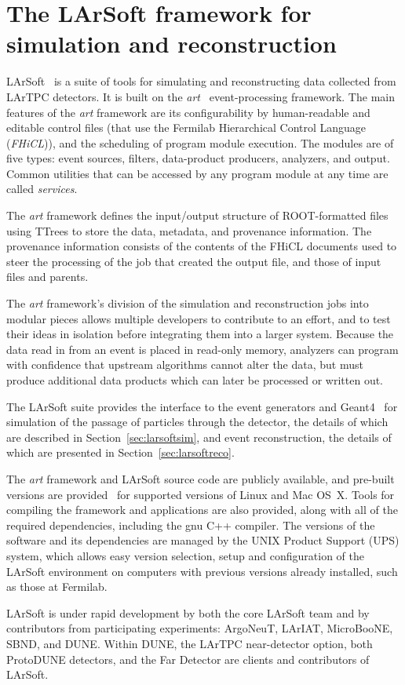 \section{The LArSoft framework for simulation and reconstruction} 
\label{sec:comp:larsoft}

LArSoft~\cite{larsoft-web} is a suite of tools for simulating and
reconstructing data collected from LArTPC detectors.  It is
built on the \textit{art}~\cite{art-web} event-processing framework.  The
main features of the \textit{art} framework are 
its configurability by
human-readable and editable control files (that use the Fermilab
Hierarchical Control Language (\textit{FHiCL})), and
the scheduling of 
program module execution. The modules are of five types: event sources, filters,
data-product producers, analyzers, and output.  
Common utilities that
can be accessed by any program module at any time are called \textit{services}.

The \textit{art} framework defines the input/output structure of
ROOT-formatted files using TTrees to store the data, metadata, and
provenance information.  The provenance information consists of the
contents of the FHiCL documents used to steer the processing of the
job that created the output file, and those of input files and parents.  

The \textit{ art} framework's division of the simulation and reconstruction
jobs into modular pieces allows multiple developers to contribute to an
effort, and to test their ideas in isolation before integrating them
into a larger system.  Because the data read in from an event is
placed in read-only memory, analyzers can program with confidence that
upstream algorithms cannot alter the data, but must produce additional
data products which can later be processed or written out.

The LArSoft suite provides the interface to the event generators and
Geant4~\cite{Agostinelli:2002hh} 
for simulation of the passage of particles
through the detector, the details of which are described in
Section~\ref{sec:larsoftsim}, and event reconstruction, the details of
which are presented in Section~\ref{sec:larsoftreco}.  

The \textit{art}
framework and LArSoft source code are publicly available, and pre-built
versions are provided~\cite{scisoft-web} for supported versions of Linux and Mac
OS~X.  Tools for compiling the framework and
applications are also provided, along with all of the required
dependencies, including the gnu C++ compiler.  The versions of the
software and its dependencies are managed by the UNIX Product Support (UPS) system,
which allows easy version selection, setup and configuration of the LArSoft
environment on computers with previous versions already installed, such as
those at Fermilab.  

LArSoft is under rapid development by both the
core LArSoft team and by contributors from participating experiments:
ArgoNeuT, LArIAT, MicroBooNE, SBND, and DUNE.  Within DUNE, the LArTPC
near-detector option, both ProtoDUNE detectors, and the Far Detector
are clients and contributors of LArSoft.
